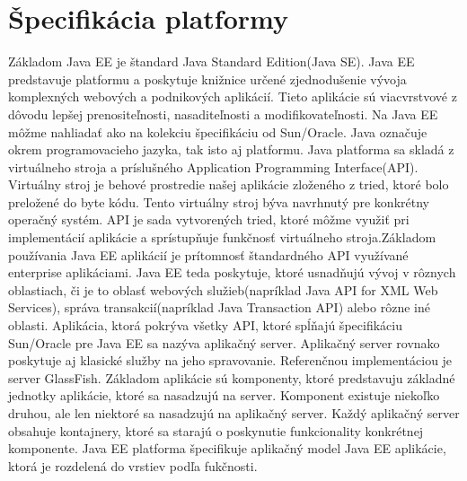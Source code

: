 \section{Špecifikácia platformy}
Základom Java EE je štandard Java Standard Edition(Java SE). Java EE predstavuje platformu a poskytuje knižnice určené zjednodušenie vývoja komplexných webových a podnikových aplikácií\cite{fitWeb}. Tieto aplikácie sú viacvrstvové z dôvodu lepšej prenositeľnosti, nasaditeľnosti a modifikovateľnosti. Na Java EE môžme nahliadať ako na kolekciu špecifikáciu od Sun/Oracle. Java označuje okrem programovacieho jazyka, tak isto aj platformu. Java platforma sa skladá z virtuálneho stroja a príslušného Application Programming Interface(API). Virtuálny stroj je behové prostredie našej aplikácie zloženého z tried, ktoré bolo preložené do byte kódu. Tento virtuálny stroj býva navrhnutý pre konkrétny operačný systém. API je sada vytvorených tried, ktoré môžme využiť pri implementácií aplikácie a sprístupňuje funkčnosť virtuálneho stroja\cite{javaeespec}.\newline \indent Základom používania Java EE aplikácií je prítomnosť štandardného API využívané enterprise aplikáciami. Java EE teda poskytuje, ktoré usnadňujú vývoj v rôznych oblastiach, či je to oblasť webových služieb(napríklad Java API for XML Web Services), správa transakcií(napríklad Java Transaction API) alebo rôzne iné oblasti. Aplikácia, ktorá pokrýva všetky API, ktoré spĺňajú špecifikáciu Sun/Oracle pre Java EE sa nazýva aplikačný server. Aplikačný server rovnako poskytuje aj klasické služby na jeho spravovanie. Referenčnou implementáciou je server GlassFish. Základom aplikácie sú komponenty, ktoré predstavuju základné jednotky aplikácie, ktoré sa nasadzujú na server. Komponent existuje niekoľko druhou, ale len niektoré sa nasadzujú na aplikačný server. Každý aplikačný server obsahuje kontajnery, ktoré sa starajú o poskynutie funkcionality konkrétnej komponente. Java EE platforma špecifikuje aplikačný model Java EE aplikácie, ktorá je rozdelená do vrstiev podľa fukčnosti.

